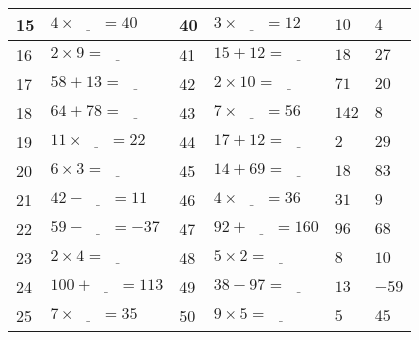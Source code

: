 \documentclass[french,a4paper,10pt]{article}
\begin{document}
{\begin{tabular}{|p{0.4cm}|p{4cm}|p{0.4cm}|p{4cm}||p{1cm}|p{1cm}|}
\hline
15 & $4 \times \underline{\phantom{999}} = 40$ & 40 & $3 \times \underline{\phantom{999}} = 12$ & $10$ & $4$ \\
\hline
16 & $2 \times 9 = \underline{\phantom{999}}$ & 41 & $15 + 12 = \underline{\phantom{999}}$ & $18$ & $27$ \\
\hline
17 & $58 + 13 = \underline{\phantom{999}}$ & 42 & $2 \times 10 = \underline{\phantom{999}}$ & $71$ & $20$ \\
\hline
18 & $64 + 78 = \underline{\phantom{999}}$ & 43 & $7 \times \underline{\phantom{999}} = 56$ & $142$ & $8$ \\
\hline
19 & $11 \times \underline{\phantom{999}} = 22$ & 44 & $17 + 12 = \underline{\phantom{999}}$ & $2$ & $29$ \\
\hline
20 & $6 \times 3 = \underline{\phantom{999}}$ & 45 & $14 + 69 = \underline{\phantom{999}}$ & $18$ & $83$ \\
\hline
21 & $42 - \underline{\phantom{999}} = 11$ & 46 & $4 \times \underline{\phantom{999}} = 36$ & $31$ & $9$ \\
\hline
22 & $59 - \underline{\phantom{999}} = -37$ & 47 & $92 + \underline{\phantom{999}} = 160$ & $96$ & $68$ \\
\hline
23 & $2 \times 4 = \underline{\phantom{999}}$ & 48 & $5 \times 2 = \underline{\phantom{999}}$ & $8$ & $10$ \\
\hline
24 & $100 + \underline{\phantom{999}} = 113$ & 49 & $38 - 97 = \underline{\phantom{999}}$ & $13$ & $-59$ \\
\hline
25 & $7 \times \underline{\phantom{999}} = 35$ & 50 & $9 \times 5 = \underline{\phantom{999}}$ & $5$ & $45$ \\
\hline

\end{tabular}
}
\begin{center}
\hspace*{1.2cm}
\vspace*{1.2cm}
\end{center}                 
\end{document}
